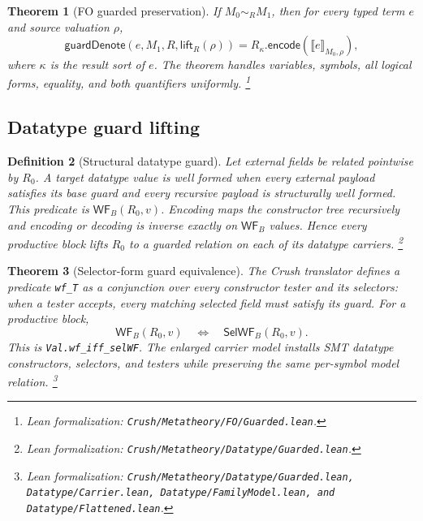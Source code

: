 \documentclass[11pt]{article}
\newtheorem{definition}{Definition}[section]
\newtheorem{theorem}[definition]{Theorem}
\theoremstyle{remark}
\newcommand{\leanfile}[1]{\footnote{Lean formalization: \texttt{Crush/Metatheory/#1}.}}
\newcommand{\leanfiles}[1]{\footnote{Lean formalization: \texttt{Crush/Metatheory/#1}.}}
\newcommand{\den}[3]{\llbracket #1\rrbracket_{#2,#3}}
\newcommand{\WF}{\mathsf{WF}}
\begin{document}
\begin{theorem}[FO guarded preservation]
If $M_0\sim_R M_1$, then for every typed term $e$ and source valuation $\rho$,
\[
 \mathsf{guardDenote}(e,M_1,R,\mathsf{lift}_R(\rho))
 =R_{\kappa}.\mathsf{encode}(\den{e}{M_0}{\rho}),
\]
where $\kappa$ is the result sort of $e$. The theorem handles variables,
symbols, all logical forms, equality, and both quantifiers uniformly.
\leanfile{FO/Guarded.lean}
\end{theorem}

\subsection{Datatype guard lifting}

\begin{definition}[Structural datatype guard]
Let external fields be related pointwise by $R_0$. A target datatype value is
well formed when every external payload satisfies its base guard and every
recursive payload is structurally well formed. This predicate is
$\WF_B(R_0,v)$. Encoding maps the constructor tree recursively and encoding or
decoding is inverse exactly on $\WF_B$ values. Hence every productive block
lifts $R_0$ to a guarded relation on each of its datatype carriers.
\leanfile{Datatype/Guarded.lean}
\end{definition}

\begin{theorem}[Selector-form guard equivalence]
The Crush translator defines a predicate \texttt{wf\_T} as a conjunction over every
constructor tester and its selectors: when a tester accepts, every matching
selected field must satisfy its guard. For a productive block,
\[
 \WF_B(R_0,v)
 \quad\Longleftrightarrow\quad
 \mathsf{SelWF}_B(R_0,v).
\]
This is \texttt{Val.wf\_iff\_selWF}. The enlarged carrier model installs
SMT datatype constructors, selectors, and testers while preserving the same
per-symbol model relation.
\leanfiles{Datatype/Guarded.lean, Datatype/Carrier.lean, Datatype/FamilyModel.lean, and Datatype/Flattened.lean}
\end{theorem}
\end{document}
